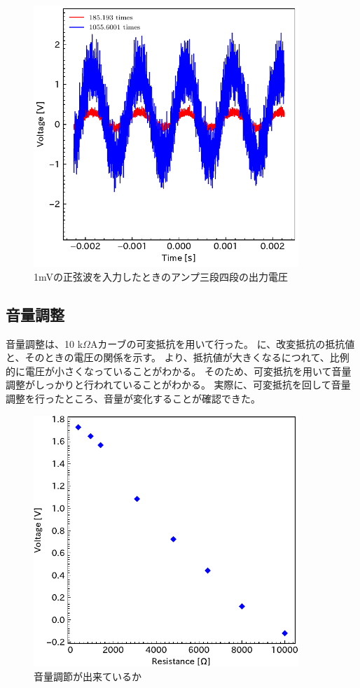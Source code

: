 \documentclass[report.tex]{subfiles}
\begin{document}
\begin{figure}[H]
	\centering
	\includegraphics[width=10cm]{fig/level34_1m.pdf}
	\caption{1mVの正弦波を入力したときのアンプ三段四段の出力電圧}
	\label{fig:34_1m}
\end{figure}

\subsection{音量調整}

音量調整は、10 k\(\Omega\)Aカーブの可変抵抗を用いて行った。
に、改変抵抗の抵抗値と、そのときの電圧の関係を示す。
より、抵抗値が大きくなるにつれて、比例的に電圧が小さくなっていることがわかる。
そのため、可変抵抗を用いて音量調整がしっかりと行われていることがわかる。
実際に、可変抵抗を回して音量調整を行ったところ、音量が変化することが確認できた。

\begin{figure}[H]
	\centering
	\includegraphics[width=10cm]{fig/resi.pdf}
	\caption{音量調節が出来ているか}
	\label{fig:resi}
\end{figure}
\end{document}
